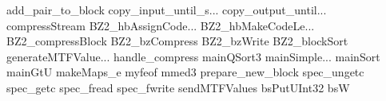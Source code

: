 add_pair_to_block
copy_input_until_s...
copy_output_until...
compressStream
BZ2_hbAssignCode...
BZ2_hbMakeCodeLe...
BZ2_compressBlock
BZ2_bzCompress
BZ2_bzWrite
BZ2_blockSort
generateMTFValue...
handle_compress
mainQSort3
mainSimple...
mainSort
mainGtU
makeMaps_e
myfeof
mmed3
prepare_new_block
spec_ungetc
spec_getc
spec_fread
spec_fwrite
sendMTFValues
bsPutUInt32
bsW
